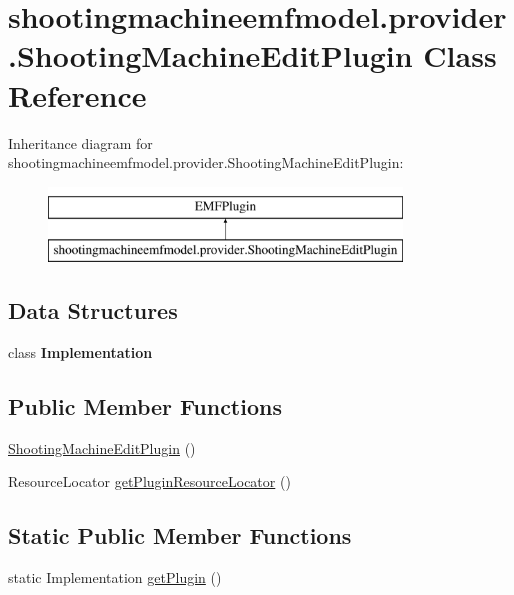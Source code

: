 \hypertarget{classshootingmachineemfmodel_1_1provider_1_1_shooting_machine_edit_plugin}{\section{shootingmachineemfmodel.\-provider.\-Shooting\-Machine\-Edit\-Plugin Class Reference}
\label{classshootingmachineemfmodel_1_1provider_1_1_shooting_machine_edit_plugin}
}
Inheritance diagram for shootingmachineemfmodel.\-provider.\-Shooting\-Machine\-Edit\-Plugin\-:\begin{figure}[H]
\begin{center}
\leavevmode
\includegraphics[height=2.000000cm]{classshootingmachineemfmodel_1_1provider_1_1_shooting_machine_edit_plugin}
\end{center}
\end{figure}
\subsection*{Data Structures}
\begin{DoxyCompactItemize}
\item 
class {\bfseries Implementation}
\end{DoxyCompactItemize}
\subsection*{Public Member Functions}
\begin{DoxyCompactItemize}
\item 
\hyperlink{classshootingmachineemfmodel_1_1provider_1_1_shooting_machine_edit_plugin_afadff5690f19999f52c5445859c18c95}{Shooting\-Machine\-Edit\-Plugin} ()
\item 
Resource\-Locator \hyperlink{classshootingmachineemfmodel_1_1provider_1_1_shooting_machine_edit_plugin_a29bcbd868e88648817ff4202fe0cc3fc}{get\-Plugin\-Resource\-Locator} ()
\end{DoxyCompactItemize}
\subsection*{Static Public Member Functions}
\begin{DoxyCompactItemize}
\item 
static Implementation \hyperlink{classshootingmachineemfmodel_1_1provider_1_1_shooting_machine_edit_plugin_aa811eb96313c0ad3ba7501794899a0e2}{get\-Plugin} ()
\end{DoxyCompactItemize}
